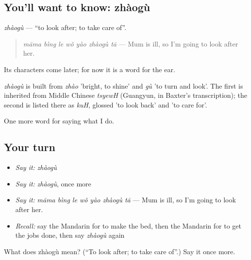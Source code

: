 \subsection*{You'll want to know: zhàogù}
\emph{zhàogù} — \textquotedblleft{}to look after; to take care of\textquotedblright{}.

\begin{quote}
\emph{māma bìng le wǒ yào zhàogù tā} — Mum is ill, so I'm going to look after her.
\end{quote}

Its characters come later; for now it is a word for the ear.

\begin{cousinweb}
\emph{zhàogù} is built from \emph{zhào} 'bright, to shine' and \emph{gù} 'to turn and look'. The first is inherited from Middle Chinese \emph{tsyewH} (Guangyun, in Baxter's transcription); the second is listed there as \emph{kuH}, glossed 'to look back' and 'to care for'.
\end{cousinweb}

\begin{grammarlens}[title={What you've built}]
One more word for saying what I do.
\end{grammarlens}

\subsection*{Your turn}
\begin{itemize}
\raggedright
  \item \emph{Say it:} \emph{zhàogù}
  \item \emph{Say it:} \emph{zhàogù}, once more
  \item \emph{Say it:} \emph{māma bìng le wǒ yào zhàogù tā} — Mum is ill, so I'm going to look after her.
  \item \emph{Recall:} say the Mandarin for to make the bed, then the Mandarin for to get the jobs done, then say \emph{zhàogù} again
\end{itemize}

\begin{tcolorbox}[breakable,colback=teal!4,colframe=teal!35!black,title={Before you move on}]
What does zhàogù mean? (\textquotedblleft{}To look after; to take care of\textquotedblright{}.) Say it once more.
\end{tcolorbox}
